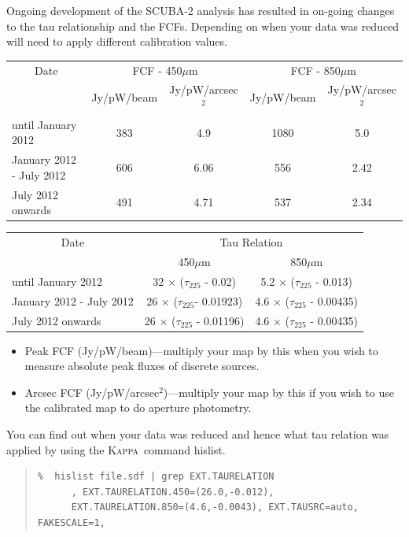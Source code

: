 \documentclass[twoside,11pt]{article}
\newcommand{\xref}[3]{#1}
\renewcommand{\_}{\texttt{\symbol{95}}}
\newenvironment{myquote}{\begin{quote}\begin{small}}{\end{small}\end{quote}}
\newcommand{\Kappa}{\xref{\textsc{Kappa}}{sun95}{}}
\newcommand{\task}[1]{\textsf{#1}}
\newcommand{\hislist}{\xref{\task{hislist}}{sun95}{HISLIST}}
\begin{document}
Ongoing development of the SCUBA-2 analysis has resulted in on-going
changes to the tau relationship and the FCFs. Depending on when your
data was reduced will need to apply different calibration values.
\\
\begin{table}[h!]
\begin{center}
\begin{tabular}{|l|c|c|c|c|}
 \hline
 \multicolumn{1}{|c|}{Date} &
 \multicolumn{2}{c|}{FCF - 450$\mu$m} &
 \multicolumn{2}{c|}{FCF - 850$\mu$m} \\
\cline{2-5}
& Jy/pW/beam &Jy/pW/arcsec$^2$ & Jy/pW/beam &Jy/pW/arcsec$^2$ \\
 \hline
until January 2012 &383  & 4.9&1080 &5.0 \\
January 2012 - July 2012&606&6.06 &556 &2.42 \\
July 2012 onwards&491 &4.71 &537 &2.34 \\
\hline
\end{tabular}
\end{center}
\end{table}
\vspace{-2mm}
\begin{table}[h!]
\begin{center}
\begin{tabular}{|l|c|c|}
 \hline
 \multicolumn{1}{|c}{Date} & \multicolumn{2}{|c|}{Tau Relation}  \\ \cline{2-3}
                           & 450$\mu$m  & 850$\mu$m \\ \hline
until January 2012       & 32 $\times$ ($\tau_{225}$ - 0.02)    & 5.2 $\times$ ($\tau_{225}$ - 0.013)  \\
January 2012 - July 2012 & 26 $\times$ ($\tau_{225}$- 0.01923)  & 4.6 $\times$ ($\tau_{225}$ - 0.00435)  \\
July 2012 onwards        & 26 $\times$ ($\tau_{225}$ - 0.01196) & 4.6 $\times$ ($\tau_{225}$ - 0.00435)  \\
\hline
\end{tabular}
\end{center}
\end{table}

\vspace{-5mm}
\begin{itemize}
\item Peak FCF (Jy/pW/beam)---multiply your map by this when you wish
to measure absolute peak fluxes of discrete sources.
\item Arcsec FCF (Jy/pW/arcsec$^2$)---multiply your map by this if
you wish to use the calibrated map to do aperture photometry.
\end{itemize}
You can find out when your data was reduced and hence what tau
relation was applied by using the \Kappa\ command \hislist.
\vspace{-2mm}
\begin{myquote}
\begin{verbatim}
%  hislist file.sdf | grep EXT.TAURELATION
      , EXT.TAURELATION.450=(26.0,-0.012),
      EXT.TAURELATION.850=(4.6,-0.0043), EXT.TAUSRC=auto, FAKESCALE=1,
\end{verbatim}
\end{myquote}
\end{document}
